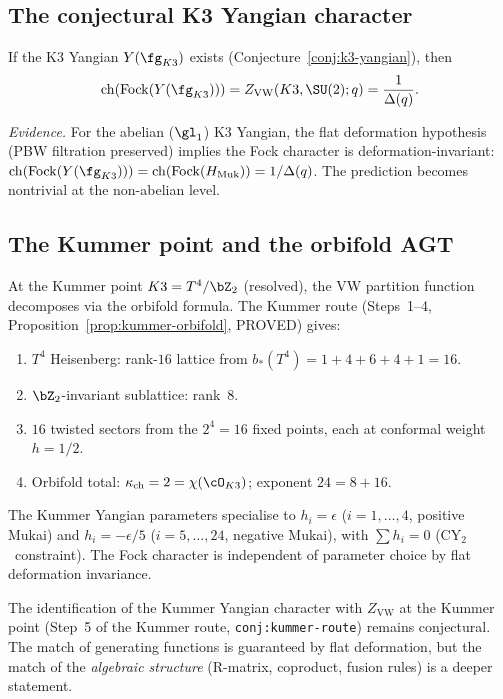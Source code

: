 \subsection{The conjectural K3 Yangian character}
\label{subsec:k3e-yangian-character-agt}

\begin{conjecture}[K3 Yangian character = VW partition function]
\label{conj:k3e-yangian-agt}
\ClaimStatusConjectured
If the K3 Yangian $Y(\fg_{K3})$ exists (Conjecture~\ref{conj:k3-yangian}), then
\[
  \mathrm{ch}(\mathrm{Fock}(Y(\fg_{K3})))
  = Z_{\mathrm{VW}}(K3, \SU(2); q)
  = \frac{1}{\Delta(q)}.
\]
\end{conjecture}

\noindent\emph{Evidence.} For the abelian ($\gl_1$) K3 Yangian, the flat deformation hypothesis (PBW filtration preserved) implies the Fock character is deformation-invariant: $\mathrm{ch}(\mathrm{Fock}(Y(\fg_{K3}))) = \mathrm{ch}(\mathrm{Fock}(H_{\mathrm{Muk}})) = 1/\Delta(q)$. The prediction becomes nontrivial at the non-abelian level.

\subsection{The Kummer point and the orbifold AGT}
\label{subsec:k3e-kummer-agt}

At the Kummer point $K3 = T^4/\bZ_2$ (resolved), the VW partition function decomposes via the orbifold formula. The Kummer route (Steps~1--4, Proposition~\ref{prop:kummer-orbifold}, PROVED) gives:
\begin{enumerate}[label=\textbf{Step~\arabic*}:]
\item $T^4$ Heisenberg: rank-$16$ lattice from $b_\ast(T^4) = 1 + 4 + 6 + 4 + 1 = 16$.
\item $\bZ_2$-invariant sublattice: rank~$8$.
\item $16$ twisted sectors from the $2^4 = 16$ fixed points, each at conformal weight $h = 1/2$.
\item Orbifold total: $\kappa_{\mathrm{ch}} = 2 = \chi(\cO_{K3})$; exponent $24 = 8 + 16$.
\end{enumerate}
The Kummer Yangian parameters specialise to $h_i = \epsilon$ ($i = 1, \ldots, 4$, positive Mukai) and $h_i = -\epsilon/5$ ($i = 5, \ldots, 24$, negative Mukai), with $\sum h_i = 0$ (CY$_2$~constraint). The Fock character is independent of parameter choice by flat deformation invariance.

\begin{remark}
\label{rem:k3e-kummer-yangian-agt}
The identification of the Kummer Yangian character with $Z_{\mathrm{VW}}$ at the Kummer point (Step~5 of the Kummer route, \texttt{conj:kummer-route}) remains conjectural. The match of generating functions is guaranteed by flat deformation, but the match of the \emph{algebraic structure} (R-matrix, coproduct, fusion rules) is a deeper statement.
\end{remark}

